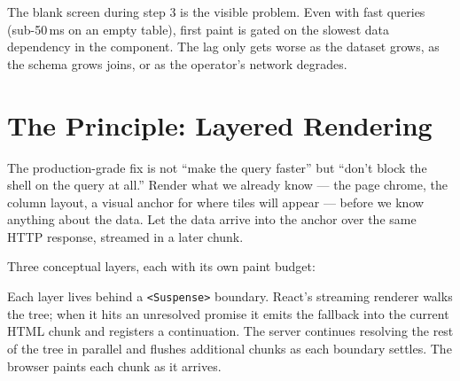 \documentclass[11pt]{article}
\begin{document}
The blank screen during step 3 is the visible problem. Even with fast queries (sub-50\,ms on an empty table), first paint is gated on the slowest data dependency in the component. The lag only gets worse as the dataset grows, as the schema grows joins, or as the operator's network degrades.

\section{The Principle: Layered Rendering}

The production-grade fix is not ``make the query faster'' but ``don't block the shell on the query at all.'' Render what we already know --- the page chrome, the column layout, a visual anchor for where tiles will appear --- before we know anything about the data. Let the data arrive into the anchor over the same HTTP response, streamed in a later chunk.

Three conceptual layers, each with its own paint budget:

\begin{center}
\end{center}

Each layer lives behind a \texttt{<Suspense>} boundary. React's streaming renderer walks the tree; when it hits an unresolved promise it emits the fallback into the current HTML chunk and registers a continuation. The server continues resolving the rest of the tree in parallel and flushes additional chunks as each boundary settles. The browser paints each chunk as it arrives.
\end{document}
